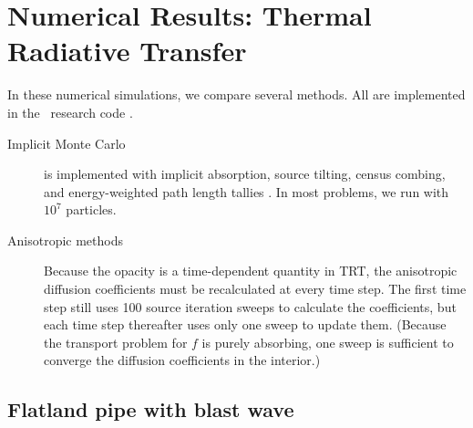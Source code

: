 
\chapter{Numerical Results: Thermal Radiative Transfer}
\label{chap:trtNumericalResults}

In these numerical simulations, we compare several methods. All
are implemented in the \pytrt\ research code \cite{Pytrt}.

\begin{description}

  \item[Implicit Monte Carlo] is implemented  with implicit
    absorption, source tilting, census combing, and
    energy-weighted path length tallies \cite{Urb2006}. In most problems, we run
    with $10^7$ particles.

  \item[Anisotropic methods] Because the opacity is a time-dependent quantity
in TRT, the anisotropic diffusion coefficients must be recalculated at every
time step. The first time step still uses 100 source iteration sweeps to
calculate the coefficients, but each time step thereafter uses only one sweep to
update them. (Because the transport problem for $f$ is purely absorbing, one
sweep is sufficient to converge the diffusion coefficients in the interior.)

\end{description}



\section{Flatland pipe with blast wave}

